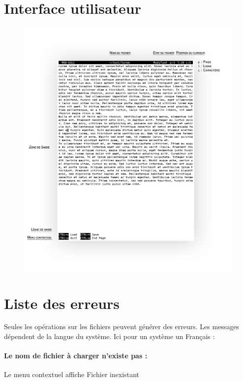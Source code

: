 \section{Interface utilisateur}
\begin{figure}[H]
\begin{center}
    \includegraphics[width=15cm]{img/MOD-Edit}
	\vspace{-1cm}
\end{center}
\end{figure}

\section{Liste des erreurs}
Seules les opérations sur les fichiers peuvent générer des erreurs. Les messages dépendent de la langue du système. Ici pour un système un Français :

\paragraph{Le nom de fichier à charger n'existe pas :} Le menu contextuel affiche \og Fichier inexistant\fg
